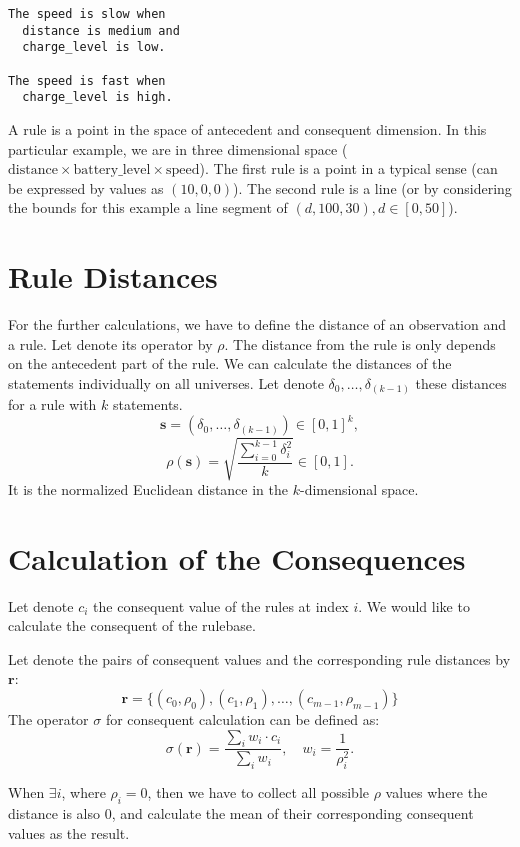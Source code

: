 \documentclass[a4paper,12pt]{article}
\begin{document}
\begin{verbatim}
The speed is slow when
  distance is medium and
  charge_level is low.

The speed is fast when
  charge_level is high.
\end{verbatim}

A rule is a point in the space of antecedent and consequent dimension. In this particular example, we are in three dimensional space ($\text{distance} \times \text{battery\_level} \times \text{speed}$). The first rule is a point in a typical sense (can be expressed by values as $(10, 0, 0)$). The second rule is a line (or by considering the bounds for this example a line segment of $(d, 100, 30), d \in [0, 50]$).

\section{Rule Distances}

For the further calculations, we have to define the distance of an observation and a rule.
Let denote its operator by $\rho$.
The distance from the rule is only depends on the antecedent part of the rule.
We can calculate the distances of the statements individually on all universes. Let denote $\delta_0, \ldots, \delta_{(k-1)}$ these distances for a rule with $k$ statements.
\[
\textbf{s} = (\delta_0, \ldots, \delta_{(k-1)}) \in [0, 1]^k,
\]
\[
\displaystyle
\rho(\textbf{s}) =
\sqrt{\dfrac{\sum_{i=0}^{k-1} \delta_i^2}{k}}
\in [0, 1].
\]
It is the normalized Euclidean distance in the $k$-dimensional space.

\section{Calculation of the Consequences}

Let denote $c_i$ the consequent value of the rules at index $i$. We would like to calculate the consequent of the rulebase.

Let denote the pairs of consequent values and the corresponding rule distances by $\textbf{r}$:
\[
\textbf{r} = \{(c_0, \rho_0), (c_1, \rho_1), \ldots, (c_{m-1}, \rho_{m-1})\}
\]
The operator $\sigma$ for consequent calculation can be defined as:
\[
\sigma(\textbf{r}) = \dfrac{\sum_{i} w_i \cdot c_i}{\sum_{i} w_i},
\quad w_i = \dfrac{1}{\rho_i^2}.
\]

When $\exists i$, where $\rho_i = 0$, then we have to collect all possible $\rho$ values where the distance is also 0, and calculate the mean of their corresponding consequent values as the result.
\end{document}
